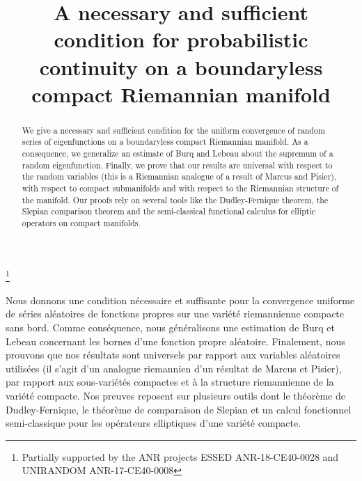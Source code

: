 \documentclass[JEP,XML,SOM,Unicode,NoEqCountersInSection,published]{cedram}
\theoremstyle{theorem}
\theoremstyle{definition}
\begin{document}
\frontmatter
\title[Condition for probabilistic continuity on a compact manifold]{A necessary and sufficient condition for probabilistic continuity on a boundaryless compact Riemannian manifold}


\author[\initial{R.} \lastname{Imekraz}]{ }
\address{La Rochelle Université, MIA, EA 3165\\
F-17031 La Rochelle, France}

\thanks{ Partially supported by the ANR projects ESSED ANR-18-CE40-0028 and UNIRANDOM ANR-17-CE40-0008}




\begin{abstract}
We give a necessary and sufficient condition for the uniform convergence of random series of eigenfunctions on a boundaryless compact Riemannian manifold. As a consequence, we generalize an estimate of Burq and Lebeau about the supremum of a random eigenfunction. Finally, we prove that our results are universal with respect to the random variables (this is a Riemannian analogue of a result of Marcus and Pisier), with respect to compact submanifolds and with respect to the Riemannian structure of the manifold. Our proofs rely on several tools like the Dudley-Fernique theorem, the Slepian comparison theorem and the semi-classical functional calculus for elliptic operators on compact manifolds.
\end{abstract}

\begin{altabstract}
Nous donnons une condition nécessaire et suffisante pour la convergence uniforme de séries aléatoires de fonctions propres sur une variété riemannienne compacte sans bord. Comme conséquence, nous généralisons une estimation de Burq et Lebeau concernant les bornes d'une fonction propre aléatoire. Finalement, nous prouvons que nos résultats sont universels par rapport aux variables aléatoires utilisées (il s'agit d'un analogue riemannien d'un résultat de Marcus et Pisier), par rapport aux sous-variétés compactes et à la structure riemannienne de la variété compacte. Nos preuves reposent sur plusieurs outils dont le théorème de Dudley-Fernique, le théorème de comparaison de Slepian et un calcul fonctionnel semi-classique pour les opérateurs elliptiques d'une variété compacte.
\end{altabstract}
\end{document}
